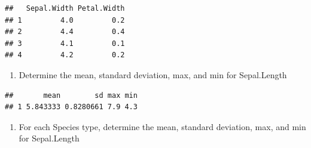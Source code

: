 \documentclass[]{book}
\newenvironment{Shaded}{\begin{snugshade}}{\end{snugshade}}
\newcommand{\CommentTok}[1]{\textcolor[rgb]{0.56,0.35,0.01}{\textit{#1}}}
\newcommand{\DataTypeTok}[1]{\textcolor[rgb]{0.13,0.29,0.53}{#1}}
\newcommand{\FloatTok}[1]{\textcolor[rgb]{0.00,0.00,0.81}{#1}}
\newcommand{\KeywordTok}[1]{\textcolor[rgb]{0.13,0.29,0.53}{\textbf{#1}}}
\newcommand{\NormalTok}[1]{#1}
\newcommand{\OperatorTok}[1]{\textcolor[rgb]{0.81,0.36,0.00}{\textbf{#1}}}
\newcommand{\StringTok}[1]{\textcolor[rgb]{0.31,0.60,0.02}{#1}}
\providecommand{\tightlist}{%
  \setlength{\itemsep}{0pt}\setlength{\parskip}{0pt}}
\begin{document}
\begin{Shaded}
\end{Shaded}

\begin{verbatim}
##   Sepal.Width Petal.Width
## 1         4.0         0.2
## 2         4.4         0.4
## 3         4.1         0.1
## 4         4.2         0.2
\end{verbatim}

\begin{enumerate}
\def\labelenumi{\arabic{enumi})}
\setcounter{enumi}{7}
\tightlist
\item
  Determine the mean, standard deviation, max, and min for Sepal.Length
\end{enumerate}

\begin{Shaded}
\end{Shaded}

\begin{verbatim}
##       mean        sd max min
## 1 5.843333 0.8280661 7.9 4.3
\end{verbatim}

\begin{enumerate}
\def\labelenumi{\arabic{enumi})}
\setcounter{enumi}{8}
\tightlist
\item
  For each Species type, determine the mean, standard deviation, max, and min for Sepal.Length
\end{enumerate}
\end{document}
